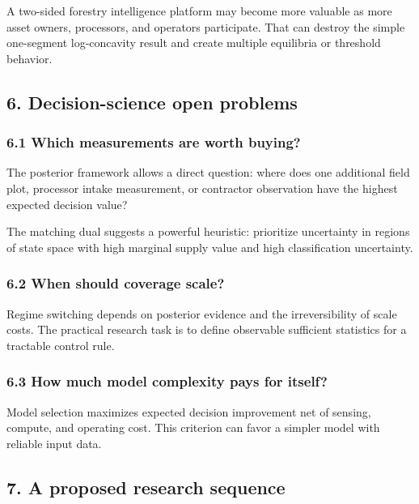 A two-sided forestry intelligence platform may become more valuable as more
asset owners, processors, and operators participate. That can destroy the simple
one-segment log-concavity result and create multiple equilibria or threshold
behavior.

\subsection{6. Decision-science open problems}\label{decision-science-open-problems}

\subsubsection{6.1 Which measurements are worth buying?}\label{which-measurements-are-worth-buying}

The posterior framework allows a direct question: where does one additional
field plot, processor intake measurement, or contractor observation have the
highest expected decision value?

The matching dual suggests a powerful heuristic: prioritize uncertainty in
regions of state space with high marginal supply value and high classification
uncertainty.

\subsubsection{6.2 When should coverage scale?}\label{when-should-coverage-scale}

Regime switching depends on posterior evidence and the irreversibility of scale
costs. The practical research task is to define observable sufficient statistics
for a tractable control rule.

\subsubsection{6.3 How much model complexity pays for itself?}\label{how-much-model-complexity-pays-for-itself}

Model selection maximizes expected decision improvement net of sensing, compute,
and operating cost. This criterion can favor a simpler model with reliable input
data.

\subsection{7. A proposed research sequence}\label{a-proposed-research-sequence}

